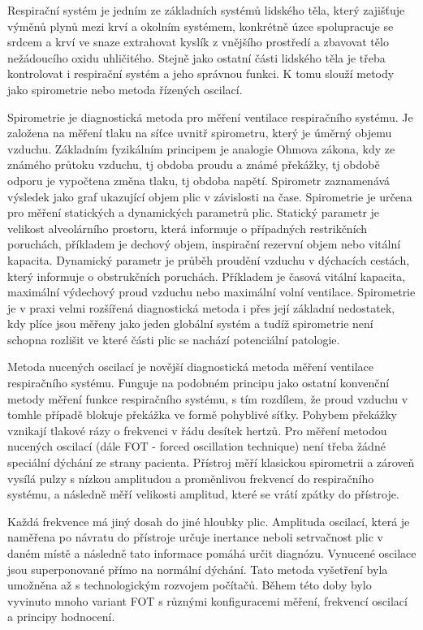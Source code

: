 
Respirační systém je jedním ze základních systémů lidského těla, který zajišťuje výměnů plynů mezi krví a okolním systémem, konkrétně úzce spolupracuje se srdcem a krví ve snaze extrahovat kyslík z vnějšího prostředí a zbavovat tělo nežádoucího oxidu uhličitého. \cite{muni} Stejně jako ostatní části lidského těla je třeba kontrolovat i respirační systém a jeho správnou funkci. K tomu slouží metody jako spirometrie nebo metoda řízených oscilací. 

Spirometrie je diagnostická metoda pro měření ventilace respiračního systému. Je založena na měření tlaku na síťce uvnitř spirometru, který je úměrný objemu vzduchu. \cite{MEFANET} Základním fyzikálním principem je analogie Ohmova zákona, kdy ze známého průtoku vzduchu, tj obdoba proudu a známé překážky, tj obdobě odporu je vypočtena změna tlaku, tj obdoba napětí. Spirometr zaznamenává výsledek jako graf ukazující objem plic v závislosti na čase. \cite{Medicon} Spirometrie je určena pro měření statických a dynamických parametrů plic. Statický parametr  je velikost alveolárního prostoru, která informuje o případných restrikčních poruchách, příkladem je dechový objem, inspirační rezervní objem nebo vitální kapacita. Dynamický parametr je průběh proudění vzduchu v dýchacích cestách, který informuje o obstrukčních poruchách. Příkladem je časová vitální kapacita, maximální výdechový proud vzduchu nebo maximální volní ventilace. \cite{lekfak}
Spirometrie je v praxi velmi rozšířená diagnostická metoda i přes její základní nedostatek, kdy plíce jsou měřeny jako jeden globální systém a tudíž spirometrie není schopna rozlišit ve které části plic se nachází potenciální patologie.

Metoda nucených oscilací je novější diagnostická metoda měření ventilace respiračního systému. Funguje na podobném principu jako ostatní konvenční metody měření funkce respiračního systému, s tím rozdílem, že proud vzduchu v tomhle případě blokuje překážka ve formě pohyblivé síťky. Pohybem překážky vznikají tlakové rázy o frekvenci v řádu desítek hertzů. Pro měření metodou nucených oscilací (dále FOT - forced oscillation technique) není třeba žádné speciální dýchání ze strany pacienta. Přístroj měří klasickou spirometrii a zároveň vysílá pulzy s nízkou amplitudou a proměnlivou frekvencí do respiračního systému, a následně měří velikosti amplitud, které se vrátí zpátky do přístroje. \cite{Oostveen}

Každá frekvence má jiný dosah do jiné hloubky plic. Amplituda oscilací, která je naměřena po návratu do přístroje určuje inertance neboli setrvačnost plic v daném místě a následně tato informace pomáhá určit diagnózu. \cite{Oostveen}
Vynucené oscilace jsou superponované přímo na normální dýchání. Tato metoda vyšetření byla umožněna až s technologickým rozvojem počítačů. \cite{Vlcek2018} Během této doby bylo vyvinuto mnoho variant FOT s různými konfiguracemi měření, frekvencí oscilací a principy hodnocení. 

